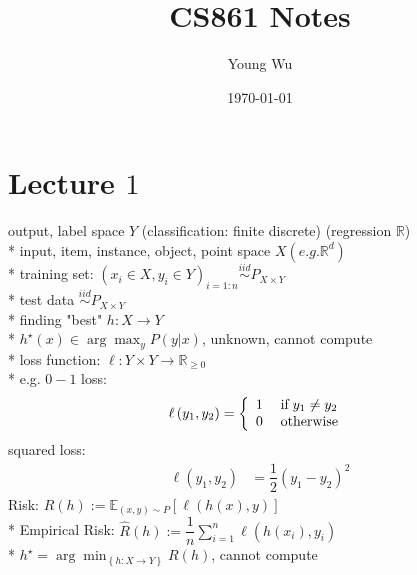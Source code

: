 \documentclass{article}
\title{CS861 Notes}
\author{Young Wu}
\date{\today}
\begin{document}
\newtheorem{thm}{Theorem}
\newtheorem{cor}{Corollary}
\newtheorem{lem}{Lemma}
\newtheorem{prop}{Proposition}
\newtheorem{conj}{Conjecture}
\newtheorem{algo}{Algorithm}
\newtheorem{obs}{Observation}
\newtheorem{clm}{Claim}
\theoremstyle{definition}
\newtheorem{df}{Definition}
\newtheorem{eg}{Example}
\newtheorem{asm}{Assumption}
\newtheorem{cond}{Condition}
\theoremstyle{remark}
\newtheorem{rmk}{Remark}
\maketitle \onehalfspacing \allowdisplaybreaks \raggedbottom


\section{Lecture $1$} 
output, label space $Y $ (classification: finite discrete) (regression $\mathbb{R}$)
\\* input, item, instance, object, point space $X  \left(e.g. \mathbb{R}^{d}\right)$
\\* training set: $\left(x_{i} \in X, y_{i} \in Y\right)_{i = 1:n} \stackrel{iid}{\sim} P_{X \times Y}$
\\* test data $\stackrel{iid}{\sim} P_{X \times Y}$
\\* finding "best" $h  : X \to  Y$
\\* $h^\star \left(x\right) \in \arg\displaystyle\max_{y} P\left(y | x\right)$, unknown, cannot compute
\\* loss function: $\ell : Y \times Y \to  \mathbb{R}_{\geq  0}$
\\* e.g. $0-1$ loss:
\[ \ell\left(y_{1}, y_{2}\right) =\left\{ \begin{array}{ll}
1& \text{\;if\;} y_{1} \neq  y_{2} \\
0& \text{\;otherwise\;} \\
\end{array}\right. \]
squared loss:
\begin{align*}
\ell\left(y_{1}, y_{2}\right) &= \dfrac{1}{2} \left(y_{1} - y_{2}\right)^{2}
\end{align*}
Risk: $R\left(h\right)  := \mathbb{E}_{\left(x, y\right) \sim  P}\left[\ell\left(h\left(x\right), y\right)\right]$
\\* Empirical Risk: $\hat{R}\left(h\right) := \dfrac{1}{n} \displaystyle\sum_{i=1}^{n} \ell\left(h\left(x_{i}\right), y_{i}\right)$
\\* $h^\star  = \arg\displaystyle\min_{\left\{h: X \to  Y\right\}} R\left(h\right) $, cannot compute
\end{document}
